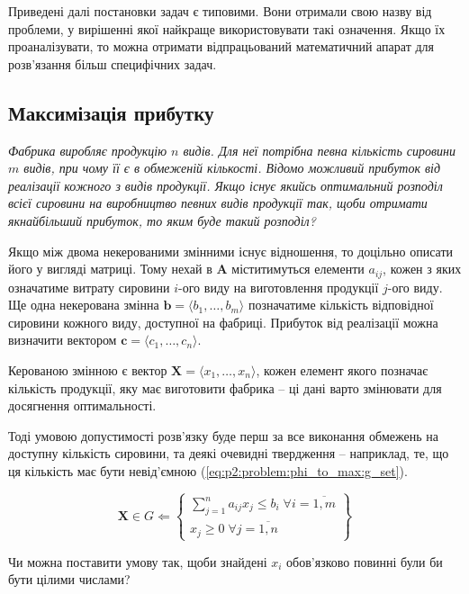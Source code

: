 \documentclass[\main/book.tex]{subfiles}
\begin{document}
Приведені далі постановки задач є типовими. Вони отримали свою назву від проблеми, у вирішенні якої найкраще використовувати такі означення. Якщо їх проаналізувати, то можна отримати відпрацьований математичний апарат для розв'язання більш специфічних задач.

\subsection{Максимізація прибутку}
\label{section:linear:phi_to_max}

\textit{Фабрика виробляє продукцію $n$ видів. Для неї потрібна певна кількість сировини $m$ видів, при чому її є в обмеженій кількості. Відомо можливий прибуток від реалізації кожного з видів продукції. Якщо існує якийсь оптимальний розподіл всієї сировини на виробництво певних видів продукції так, щоби отримати якнайбільший прибуток, то яким буде такий розподіл?}

Якщо між двома некерованими змінними існує відношення, то доцільно описати його у вигляді матриці. Тому нехай в $\mathbf{A}$ міститимуться елементи $a_{ij}$, кожен з яких означатиме витрату сировини $i$-ого виду на виготовлення продукції $j$-ого виду. Ще одна некерована змінна $\mathbf{b} = \langle b_1, \ldots, b_m \rangle$ позначатиме кількість відповідної сировини кожного виду, доступної на фабриці. Прибуток від реалізації можна визначити вектором $\mathbf{c} = \langle c_1, \ldots, c_n \rangle$.

Керованою змінною є вектор $\mathbf{X} = \langle x_1, \ldots, x_n \rangle$, кожен елемент якого позначає кількість продукції, яку має виготовити фабрика -- ці дані варто змінювати для досягнення оптимальності.

Тоді умовою допустимості розв'язку буде перш за все виконання обмежень на доступну кількість сировини, та деякі очевидні твердження -- наприклад, те, що ця кількість має бути невід'ємною (\ref{eq:p2:problem:phi_to_max:g_set}).

\begin{equation}
 \mathbf{X} \in G \Leftarrow
 \left\{
  \begin{array}{l}
   \displaystyle \sum_{j=1}^n a_{ij} x_j \leq b_i\;
   \forall i = \overline{1, m} \\
   x_j \geq 0 \; \forall j = \overline{1, n}
  \end{array}
 \right\}
 \label{eq:p2:problem:phi_to_max:g_set}
\end{equation}

\begin{question}
Чи можна поставити умову так, щоби знайдені $x_i$ обов'язково повинні були би бути цілими числами?
\end{question}
\end{document}
